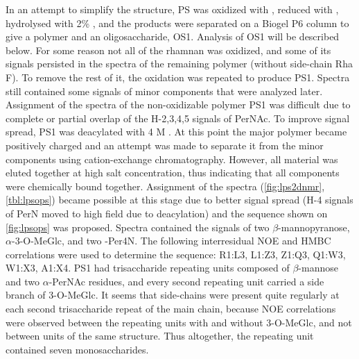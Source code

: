 In an attempt to simplify the structure, \ac{PS} was oxidized with , reduced with
, hydrolysed with 2\% , and the products were separated on a Biogel P6 column
to give a polymer and an oligosaccharide, \ac{OS}1. Analysis of \ac{OS}1 will be described below. For
some reason not all of the rhamnan was oxidized, and some of its signals persisted in the
spectra of the remaining polymer (without side-chain Rha F). To remove the rest of it, the
oxidation was repeated to produce \ac{PS}1. Spectra still contained some signals of minor
components that were analyzed later. Assignment of the spectra of the non-oxidizable polymer \ac{PS}1 was
difficult due to complete or partial overlap of the H-2,3,4,5 signals of PerNAc. To improve
signal spread, \ac{PS}1 was deacylated with 4 M . At this point the major polymer
became positively charged and an attempt was made to separate it from the minor components using
cation-exchange chromatography. However, all material was eluted together at high salt
concentration, thus indicating that all components were chemically bound together. Assignment of
the spectra (\cref{fig:lps2dnmr}, \cref{tbl:lpsops}) became possible at this stage due to better
signal spread (H-4 signals of PerN moved to high field due to deacylation) and the sequence
shown on \cref{fig:lpsops} was proposed. Spectra contained the signals of two
$\beta$-mannopyranose, $\alpha$-3-O-MeGlc, and two -Per4N. The following interresidual \ac{NOE}
and \ac{HMBC} correlations were used to determine the sequence: R1:L3, L1:Z3, Z1:Q3, Q1:W3,
W1:X3, A1:X4. \Ac{PS}1 had trisaccharide repeating units composed of $\beta$-mannose and two
$\alpha$-PerNAc residues, and every second repeating unit carried a side branch of 3-O-MeGlc. It
seems that side-chains were present quite regularly at each second trisaccharide repeat of the
main chain, because \ac{NOE} correlations were observed between the repeating units with and
without 3-O-MeGlc, and not between units of the same structure. Thus altogether, the repeating
unit contained seven monosaccharides.

